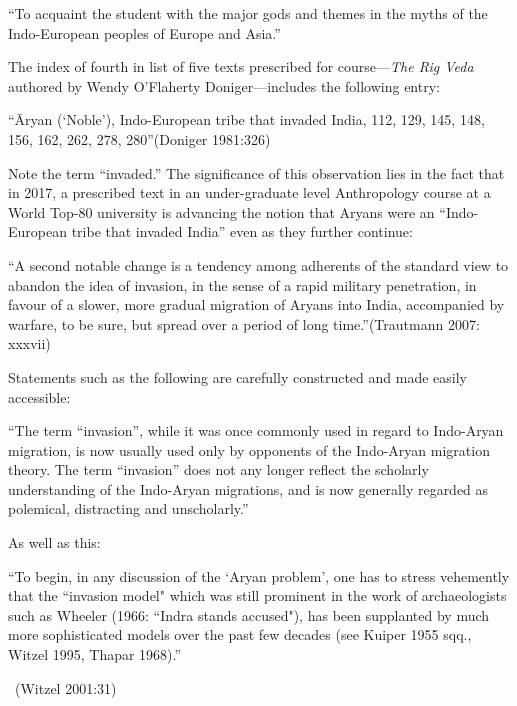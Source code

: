 \begin{myquote}
“To acquaint the student with the major gods and themes in the myths of the Indo-European peoples of Europe and Asia.”
\end{myquote}

The index of fourth in list of five texts prescribed for course—\textit{The Rig Veda} authored by Wendy O'Flaherty Doniger—includes the following entry:

\begin{myquote}
“Āryan (‘Noble’), Indo-European tribe that invaded India, 112, 129, 145, 148, 156, 162, 262, 278, 280”\hfill (Doniger 1981:326)
\end{myquote}

Note the term “invaded.” The significance of this observation lies in the fact that in 2017, a prescribed text in an under-graduate level Anthropology course at a World Top-80 university is advancing the notion that Aryans were an “Indo-European tribe that invaded India” even as they further continue:

\begin{myquote}
“A second notable change is a tendency among adherents of the standard view to abandon the idea of invasion, in the sense of a rapid military penetration, in favour of a slower, more gradual migration of Aryans into India, accompanied by warfare, to be sure, but spread over a period of long time.”\hfill (Trautmann 2007: xxxvii)
\end{myquote}

Statements such as the following are carefully constructed and made easily accessible:

\begin{myquote}
“The term “invasion”, while it was once commonly used in regard to Indo-Aryan migration, is now usually used only by opponents of the Indo-Aryan migration theory. The term “invasion” does not any longer reflect the scholarly understanding of the Indo-Aryan migrations, and is now generally regarded as polemical, distracting and unscholarly.”
\end{myquote}

As well as this:

\begin{myquote}
“To begin, in any discussion of the `Aryan problem', one has to stress vehemently that the ``invasion model" which was still prominent in the work of archaeologists such as Wheeler (1966: ``Indra stands accused"), has been supplanted by much more sophisticated models over the past few decades (see Kuiper 1955 sqq., Witzel 1995, Thapar 1968).”

~\hfill (Witzel 2001:31)
\end{myquote}


